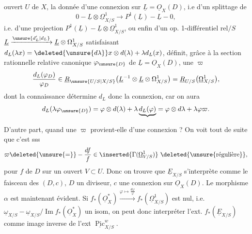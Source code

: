 ouvert  $U$ de $X$, la donnée d'une connexion sur $\underline L=\underline O_X(D)$, i.e d'un splittage de
\[
0\mathbin{-}\underline L\otimes\underline\Omega^1_{X/S}\to P^1(\underline L)\mathbin{-}\underline L\mathbin{-}0,
\]
i.e. d'une projection $P^1(\underline L)\mathbin{-}\underline L\otimes\underline\Omega^1_{X/S}$, ou enfin d'un op. 1-différentiel rel$/S$
$\underline L\xrightarrow{\unsure{d'_L|d_L}}\underline L\otimes\Omega^1_{X/S}$ satisfaisant $d_L(\lambda x)=\deleted{\unsure{d\lambda}}x\otimes d(\lambda)+\lambda d_L(x)$,
 définit, grâce à la section rationnelle relative canonique $\varphi_{\unsure{D}}$ de $\underline L=\underline O_X(D)$, une  $\varpi$
\[
\frac{d_L(\varphi_D)}{\varphi_D}\in\underline R_{\unsure{U/S|X/S}}\bigl(\underline L^{-1}\otimes\underline L\otimes\Omega^1_{X/S}\bigr)=\underline R_{U/S}\bigl(\underline\Omega^1_{X/S}\bigr),
\]
dont la connaissance détermine $d_L$ donc la connexion, car on aura 
\[
d_L(\lambda\varphi_{\unsure{D}})=\varphi\otimes d(\lambda)+\lambda\underbrace{d_L(\varphi)}=\varphi\otimes d\lambda+\lambda\varphi\varpi.
\]

 D'autre part, quand une $\varpi$ provient-elle d'une connexion ? On voit tout de suite que c'est sss
\[
\varpi\deleted{\unsure{=}}-\frac{df}{f}\in\inserted{\Gamma(\underline\Omega^1_{V/S})}\ \deleted{\text{\unsure{régulière}}},
\]
pour   $f$ de $D$ sur un ouvert $V\subset U$. Donc on trouve que $\underline E_{X/S}$ s'interprète comme le faisceau des $(D,c)$, $D$ un diviseur, $c$ une connexion sur $\underline O_X(D)$. Le morphisme $\alpha$ est maintenant évident. Si $f_*(\underline O_X^{*})\xrightarrow{\varphi\mapsto\frac{d\varphi}{\varphi}}f_*(\underline\Omega^1_{X/S})$ est nul, i.e. $\underline\omega_{X/S}\mathbin{-}\underline\omega_{X/S}/\operatorname{Im}f_*(\underline O_X^{*})$ un isom, on peut donc interpréter l'ext. $f_*(\underline E_{X/S})$ comme image inverse de l'ext $\underline{\operatorname{Pic}}_{X/S}^{w}$.


